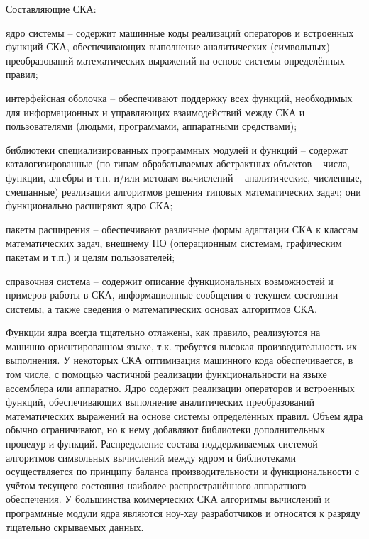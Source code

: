 Составляющие СКА:
\begin{textitemize}
	\item ядро системы -- содержит машинные коды реализаций операторов и встроенных функций СКА, обеспечивающих выполнение аналитических (символьных) преобразований математических выражений на основе системы определённых правил;
	\item интерфейсная оболочка -- обеспечивают поддержку всех функций, 
	необходимых для информационных и управляющих взаимодействий между 
	СКА и пользователями (людьми, программами, аппаратными средствами);
	\item библиотеки специализированных программных модулей и функций -- содержат каталогизированные (по типам 
	обрабатываемых абстрактных объектов – числа, функции, алгебры и т.п. и/или методам вычислений -- аналитические, численные, смешанные) реализации алгоритмов решения типовых математических задач; они функционально расширяют ядро СКА;
	\item пакеты расширения -- обеспечивают различные формы адаптации СКА к классам математических задач, внешнему ПО (операционным системам, графическим пакетам и т.п.) и целям пользователей;
	\item справочная система -- содержит описание функциональных возможностей и примеров работы в СКА, информационные сообщения о текущем состоянии системы, а также сведения о математических основах алгоритмов СКА.
\end{textitemize}
Функции ядра всегда тщательно отлажены, как правило, реализуются на машинно-ориентированном языке, т.к. требуется высокая производительность их выполнения. У некоторых СКА оптимизация машинного кода обеспечивается, в том числе, с помощью частичной реализации функциональности на языке ассемблера или аппаратно. Ядро содержит реализации операторов и встроенных функций, обеспечивающих выполнение аналитических преобразований математических выражений на основе системы определённых правил. Объем ядра обычно ограничивают, но к нему добавляют библиотеки дополнительных процедур и функций. Распределение состава поддерживаемых системой алгоритмов символьных вычислений между ядром и библиотеками осуществляется по принципу баланса производительности и функциональности с учётом текущего состояния наиболее распространённого аппаратного обеспечения. У большинства коммерческих СКА алгоритмы вычислений и программные модули ядра являются ноу-хау разработчиков и относятся к разряду тщательно скрываемых данных.

